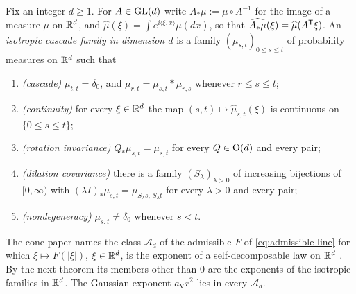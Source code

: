 \begin{definition}\label{def:isotropic-kernel-family}
Fix an integer $d \ge 1$. For $A \in \mathrm{GL}(d)$ write $A_*\mu := \mu \circ A^{-1}$ for the image of a
measure $\mu$ on $\mathbb{R}^d$, and $\widehat\mu(\xi) = \int e^{i\langle\xi,x\rangle}\mu(dx)$, so that
$\widehat{A_*\mu}(\xi) = \widehat\mu(A^{\mathsf{T}}\xi)$. An \emph{isotropic cascade family in dimension
$d$} is a family $(\mu_{s,t})_{0 \le s \le t}$ of probability measures on $\mathbb{R}^d$ such that
\begin{enumerate}
\item[(I1)] \emph{(cascade)} $\mu_{t,t} = \delta_0$, and $\mu_{r,t} = \mu_{s,t} * \mu_{r,s}$
whenever $r \le s \le t$;
\item[(I2)] \emph{(continuity)} for every $\xi \in \mathbb{R}^d$ the map
$(s,t) \mapsto \widehat\mu_{s,t}(\xi)$ is continuous on $\{0 \le s \le t\}$;
\item[(I3)] \emph{(rotation invariance)} $Q_*\mu_{s,t} = \mu_{s,t}$ for every $Q \in \mathrm{O}(d)$
and every pair;
\item[(I4)] \emph{(dilation covariance)} there is a family $(S_\lambda)_{\lambda > 0}$ of
increasing bijections of $[0,\infty)$ with $(\lambda I)_*\mu_{s,t} = \mu_{S_\lambda s,\,S_\lambda t}$
for every $\lambda > 0$ and every pair;
\item[(ND)] \emph{(nondegeneracy)} $\mu_{s,t} \ne \delta_0$ whenever $s < t$.
\end{enumerate}
\end{definition}

The cone paper names the class $\mathcal{A}_d$ of the admissible $F$ of \ref{eq:admissible-line}
for which $\xi \mapsto F(|\xi|)$, $\xi \in \mathbb{R}^d$, is the exponent of a self-decomposable law on
$\mathbb{R}^d$ . By the next theorem its members other than $0$ are the exponents of
the isotropic families in $\mathbb{R}^d$. The Gaussian exponent $a_{\mathrm V}r^2$ lies in every
$\mathcal A_d$.

